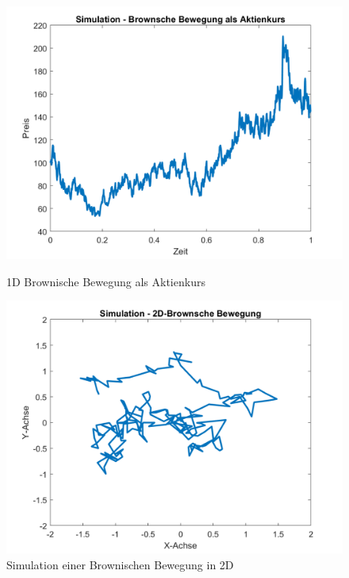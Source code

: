 \begin{figure}
	\centering
	\begin{minipage}{0.45\textwidth}
		\centering
		\includegraphics[width=\linewidth]{papers/brown/images/Aktienkurs-als-Brownische-Bewegung_2.png}
		\caption{1D Brownische Bewegung als Aktienkurs}
	\end{minipage}
	\hspace{0.05\linewidth}
	\begin{minipage}{0.45\textwidth}
		\centering
		\includegraphics[width=\linewidth]{papers/brown/images/Brownische-Bewegung-Simuliert_2.png}
		\caption{Simulation einer Brownischen Bewegung in 2D}
	\end{minipage}
	\label{2D3Dbrownian}
\end{figure}

